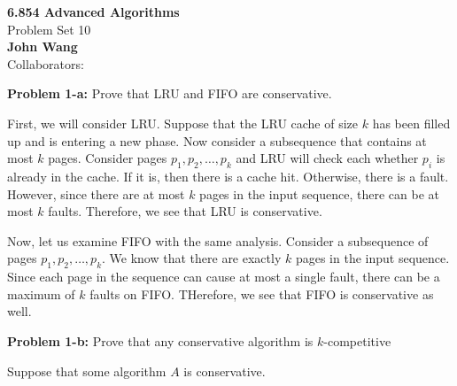 \documentclass[psamsfonts]{amsart}
\newenvironment{sol}{\vspace{0.25cm}{\large \bfseries Solution:}}{\qedsymbol}
\newenvironment{prob}[1]{\begin{framed}{\large \bfseries Problem #1:}}{\end{framed}}
\newcommand{\makenewtitle}{
    \begin{center}
    {\huge \bfseries 6.854 Advanced Algorithms} \\
    Problem Set 10\\
    \vspace{0.25cm}
    {\bfseries John Wang} \\
    Collaborators:  
    \end{center}
    \vspace{0.5cm}
}
\begin{document}
\makenewtitle

\begin{prob}{1-a}
Prove that LRU and FIFO are conservative.
\end{prob}
\begin{sol}
First, we will consider LRU. Suppose that the LRU cache of size $k$ has been filled up and is entering a new phase. Now consider a subsequence that contains at most $k$ pages. Consider pages $p_1, p_2, \ldots, p_k$ and LRU will check each whether $p_i$ is already in the cache. If it is, then there is a cache hit. Otherwise, there is a fault. However, since there are at most $k$ pages in the input sequence, there can be at most $k$ faults. Therefore, we see that LRU is conservative.

Now, let us examine FIFO with the same analysis. Consider a subsequence of pages $p_1, p_2, \ldots, p_k$. We know that there are exactly $k$ pages in the input sequence. Since each page in the sequence can cause at most a single fault, there can be a maximum of $k$ faults on FIFO. THerefore, we see that FIFO is conservative as well.
\end{sol}

\begin{prob}{1-b}
Prove that any conservative algorithm is $k$-competitive
\end{prob}
\begin{sol}
Suppose that some algorithm $A$ is conservative. 
\end{sol}
\end{document}

